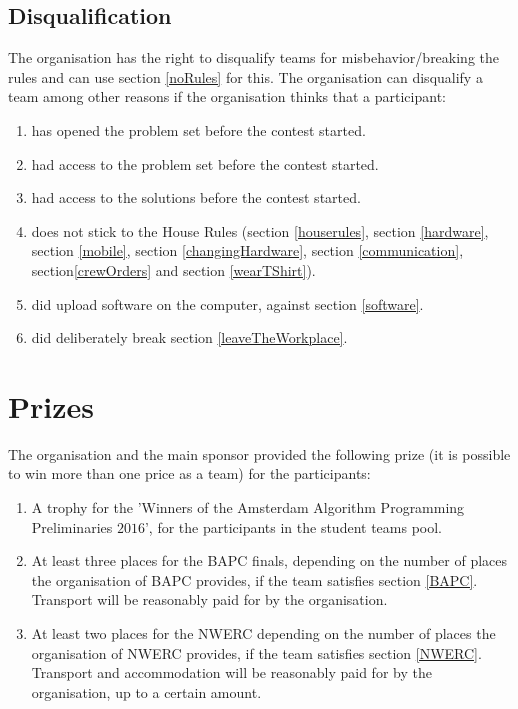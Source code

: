 \documentclass[11pt]{report}
\begin{document}
\section{Disqualification}
The organisation has the right to disqualify teams for misbehavior/breaking the rules and can use section \ref{noRules} for this. The organisation can disqualify a team among other reasons if the organisation thinks that a participant:
\begin{enumerate}[label=\bfseries 4.7.\arabic*]
\item \label{Problemset} has opened the problem set before the contest started.
\item \label{proofProblemset} had access to the problem set before the contest started.
\item \label{proofSolutions} had access to the solutions before the contest started.
\item does not stick to the House Rules (section \ref{houserules}, section \ref{hardware}, section \ref{mobile}, section \ref{changingHardware}, section \ref{communication}, section\ref{crewOrders} and section \ref{wearTShirt}).
\item did upload software on the computer, against section \ref{software}.
\item did deliberately break section \ref{leaveTheWorkplace}.
\end{enumerate}

\chapter{Prizes}
The organisation and the main sponsor provided the following prize (it is possible to win more than one price as a team) for the participants:
\begin{enumerate}[label=\bfseries 5.\arabic*]
\item A trophy for the 'Winners of the Amsterdam Algorithm Programming Preliminaries $2016$', for the participants in the student teams pool.
\item At least three places for the BAPC finals, depending on the number of places the organisation of BAPC provides, if the team satisfies section \ref{BAPC}. Transport will be reasonably paid for by the organisation.
\item At least two places for the NWERC depending on the number of places the organisation of NWERC provides, if the team satisfies section \ref{NWERC}. Transport and accommodation will be reasonably paid for by the organisation, up to a certain amount. 
\end{enumerate}
\end{document}
